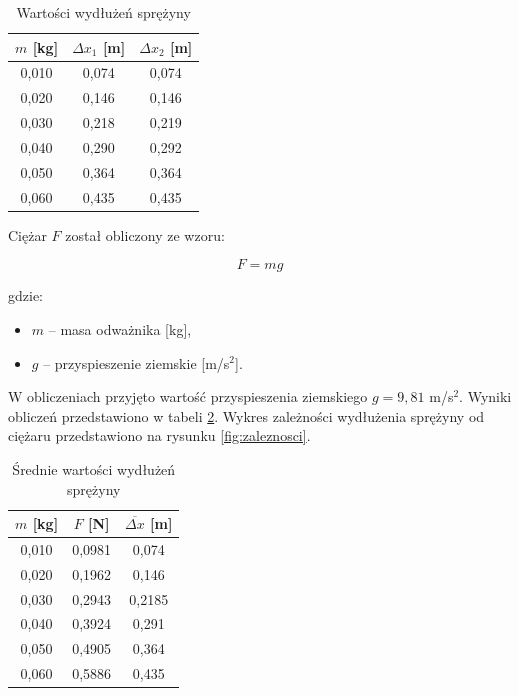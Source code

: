 \documentclass[a4paper,12pt]{article}
\begin{document}
\begin{table}[H]
    \centering
    \begin{tabular}{|c|c|c|}
        \hline
        $m$ [kg] & $\Delta x_1$ [m] & $\Delta x_2$ [m] \\
        \hline
        0,010 & 0,074 & 0,074 \\
        0,020 & 0,146 & 0,146 \\
        0,030 & 0,218 & 0,219 \\
        0,040 & 0,290 & 0,292 \\
        0,050 & 0,364 & 0,364 \\
        0,060 & 0,435 & 0,435 \\
        \hline
    \end{tabular}
    \caption{Wartości wydłużeń sprężyny}
    \label{tab:delta_x}
\end{table}

Ciężar $F$ został obliczony ze wzoru:

\begin{equation*}
    F = mg
\end{equation*}

gdzie:
\begin{itemize}
    \setlength{\itemsep}{0em}
    \item $m$ -- masa odważnika [kg],
    \item $g$ -- przyspieszenie ziemskie [m/s$^2$].
\end{itemize}

W obliczeniach przyjęto wartość przyspieszenia ziemskiego $g = 9,81$ m/s$^2$.
Wyniki obliczeń przedstawiono w tabeli \ref{tab:wydluzenia}.
Wykres zależności wydłużenia sprężyny od ciężaru przedstawiono na rysunku \ref{fig:zaleznosci}.

\begin{table}[H]
    \centering
    \begin{tabular}{|c|c|c|}
        \hline
        $m$ [kg] & $F$ [N] & $\overline{\Delta x}$ [m] \\
        \hline
        0,010 & 0,0981 & 0,074 \\
        0,020 & 0,1962 & 0,146 \\
        0,030 & 0,2943 & 0,2185 \\
        0,040 & 0,3924 & 0,291 \\
        0,050 & 0,4905 & 0,364 \\
        0,060 & 0,5886 & 0,435 \\
        \hline
    \end{tabular}
    \caption{Średnie wartości wydłużeń sprężyny}
    \label{tab:wydluzenia}
\end{table}
\end{document}
